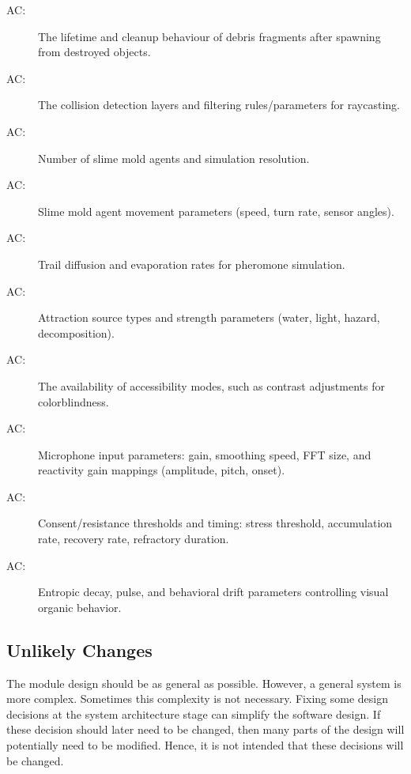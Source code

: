 \documentclass[12pt, titlepage]{article}
\newcounter{acnum}
\newcommand{\actheacnum}{AC\theacnum}
\begin{document}
\begin{description}
\item[ \actheacnum\label{AC14}:] The lifetime and cleanup behaviour of debris fragments after spawning from destroyed objects.
\item[ \actheacnum\label{AC15}:] The collision detection layers and filtering rules/parameters for raycasting.
\item[ \actheacnum\label{AC16}:] Number of slime mold agents and simulation resolution.
\item[ \actheacnum\label{AC17}:] Slime mold agent movement parameters (speed, turn rate, sensor angles).
\item[ \actheacnum\label{AC18}:] Trail diffusion and evaporation rates for pheromone simulation.
\item[ \actheacnum\label{AC19}:] Attraction source types and strength parameters (water, light, hazard, decomposition).
\item[ \actheacnum\label{AC20}:] The availability of accessibility modes, such as contrast adjustments for colorblindness.
\item[ \actheacnum\label{AC21}:] Microphone input parameters: gain, smoothing speed, FFT size, and reactivity gain mappings (amplitude, pitch, onset).
\item[ \actheacnum\label{AC22}:] Consent/resistance thresholds and timing: stress threshold, accumulation rate, recovery rate, refractory duration.
\item[ \actheacnum\label{AC23}:] Entropic decay, pulse, and behavioral drift parameters controlling visual organic behavior.
\end{description}


\subsection{Unlikely Changes} \label{SecUchange}

The module design should be as general as possible. However, a general system is
more complex. Sometimes this complexity is not necessary. Fixing some design
decisions at the system architecture stage can simplify the software design. If
these decision should later need to be changed, then many parts of the design
will potentially need to be modified. Hence, it is not intended that these
decisions will be changed.
\end{document}
